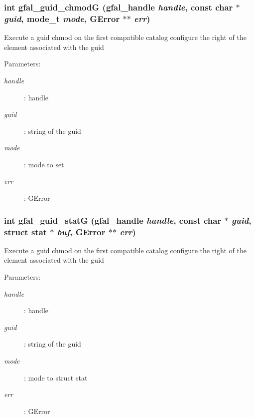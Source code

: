 \subsubsection{\setlength{\rightskip}{0pt plus 5cm}int gfal\_\-guid\_\-chmod\-G (gfal\_\-handle {\em handle}, const char $\ast$ {\em guid}, mode\_\-t {\em mode}, GError $\ast$$\ast$ {\em err})}\label{gfal__common__guid_8c_34d01b3a64910eddc1d7988c6b1b2ae4}


Execute a guid chmod on the first compatible catalog configure the right of the element associated with the guid \begin{Desc}
\item[Parameters:]
\begin{description}
\item[{\em handle}]: handle \item[{\em guid}]: string of the guid \item[{\em mode}]: mode to set \item[{\em err}]: GError \end{description}
\end{Desc}
\subsubsection{\setlength{\rightskip}{0pt plus 5cm}int gfal\_\-guid\_\-stat\-G (gfal\_\-handle {\em handle}, const char $\ast$ {\em guid}, struct stat $\ast$ {\em buf}, GError $\ast$$\ast$ {\em err})}\label{gfal__common__guid_8c_8aebd0a4a29dd4154971395741587405}


Execute a guid chmod on the first compatible catalog configure the right of the element associated with the guid \begin{Desc}
\item[Parameters:]
\begin{description}
\item[{\em handle}]: handle \item[{\em guid}]: string of the guid \item[{\em mode}]: mode to struct stat \item[{\em err}]: GError \end{description}
\end{Desc}
